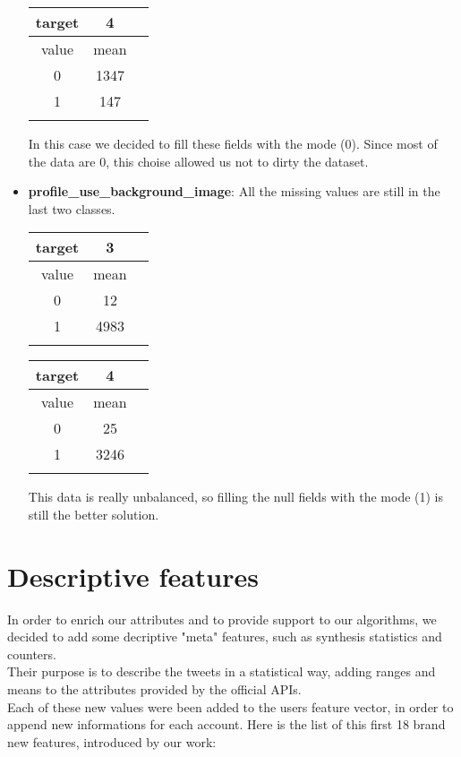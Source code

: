 \begin{itemize}
\begin{center}
		\begin{tabular}{ccc}
			\\target&4\\
			\hline\hline
			value&mean\\
			\hline\hline
			0&1347\\
			1&147\\\hline\\
		\end{tabular}
	\end{center}
	In this case we decided to fill these fields with the mode (0). Since most of the data are 0, this choise allowed us not to dirty the dataset.
	
	
	\item[\PencilRight]\textbf{profile\_use\_background\_image}: All the missing values are still in the last two classes.
	\begin{center}
		\begin{tabular}{ccc}
			\\target&3\\
			\hline\hline
			value&mean\\
			\hline\hline
			0&12\\
			1&4983\\\hline\\
		\end{tabular}
		
		\begin{tabular}{ccc}
			\\target&4\\
			\hline\hline
			value&mean\\
			\hline\hline
			0&25\\
			1&3246\\\hline\\
		\end{tabular}
	\end{center}
	This data is really unbalanced, so filling the null fields with the mode (1) is still the better solution.
	
\end{itemize}
\section{Descriptive features}

In order to enrich our attributes and to provide support to our algorithms, we decided to add some decriptive "meta" features, such as synthesis statistics and counters.\\
Their purpose is to describe the tweets in a statistical way, adding ranges and means to the attributes provided by the official APIs.\\
Each of these new values were been added to the users feature vector, in order to append new informations for each account.
Here is the list of this first 18 brand new features, introduced by our work:

